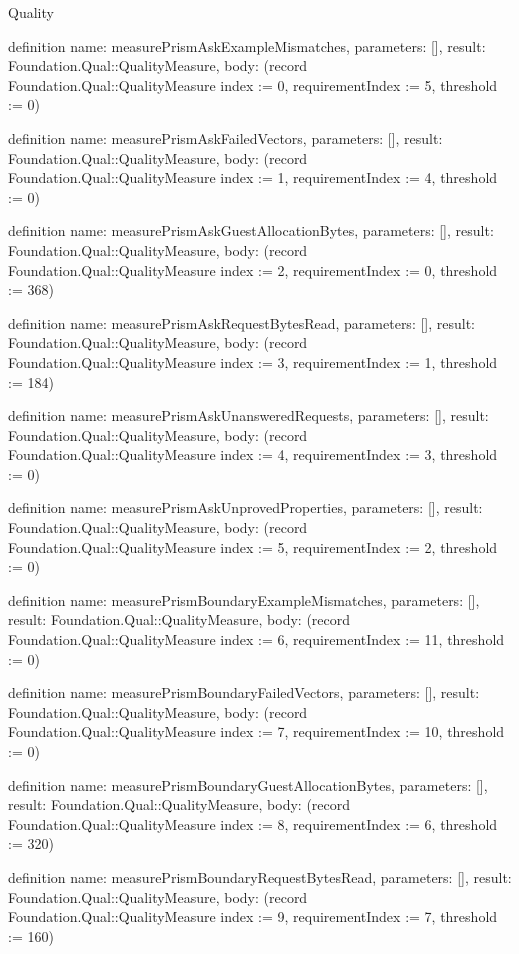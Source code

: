 \begin{lexlean}{Quality}
\begin{semanticmodule}
definition{
  name: measurePrismAskExampleMismatches,
  parameters: [],
  result: Foundation.Qual::QualityMeasure,
  body: (record Foundation.Qual::QualityMeasure {index := 0, requirementIndex := 5, threshold := 0})
}

definition{
  name: measurePrismAskFailedVectors,
  parameters: [],
  result: Foundation.Qual::QualityMeasure,
  body: (record Foundation.Qual::QualityMeasure {index := 1, requirementIndex := 4, threshold := 0})
}

definition{
  name: measurePrismAskGuestAllocationBytes,
  parameters: [],
  result: Foundation.Qual::QualityMeasure,
  body: (record Foundation.Qual::QualityMeasure {index := 2, requirementIndex := 0, threshold := 368})
}

definition{
  name: measurePrismAskRequestBytesRead,
  parameters: [],
  result: Foundation.Qual::QualityMeasure,
  body: (record Foundation.Qual::QualityMeasure {index := 3, requirementIndex := 1, threshold := 184})
}

definition{
  name: measurePrismAskUnansweredRequests,
  parameters: [],
  result: Foundation.Qual::QualityMeasure,
  body: (record Foundation.Qual::QualityMeasure {index := 4, requirementIndex := 3, threshold := 0})
}

definition{
  name: measurePrismAskUnprovedProperties,
  parameters: [],
  result: Foundation.Qual::QualityMeasure,
  body: (record Foundation.Qual::QualityMeasure {index := 5, requirementIndex := 2, threshold := 0})
}

definition{
  name: measurePrismBoundaryExampleMismatches,
  parameters: [],
  result: Foundation.Qual::QualityMeasure,
  body: (record Foundation.Qual::QualityMeasure {index := 6, requirementIndex := 11, threshold := 0})
}

definition{
  name: measurePrismBoundaryFailedVectors,
  parameters: [],
  result: Foundation.Qual::QualityMeasure,
  body: (record Foundation.Qual::QualityMeasure {index := 7, requirementIndex := 10, threshold := 0})
}

definition{
  name: measurePrismBoundaryGuestAllocationBytes,
  parameters: [],
  result: Foundation.Qual::QualityMeasure,
  body: (record Foundation.Qual::QualityMeasure {index := 8, requirementIndex := 6, threshold := 320})
}

definition{
  name: measurePrismBoundaryRequestBytesRead,
  parameters: [],
  result: Foundation.Qual::QualityMeasure,
  body: (record Foundation.Qual::QualityMeasure {index := 9, requirementIndex := 7, threshold := 160})
}


\end{semanticmodule}
\end{lexlean}
